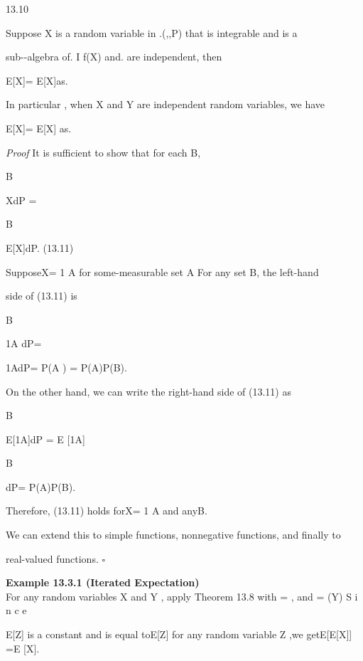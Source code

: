 \begin{thmbox}{13.10}
\end{thmbox}

Suppose X is a random variable in .(\Omega,,P) that is integrable and is a

sub-\sigma-algebra of. I f\sigma(X) and. are independent, then

E[X\vert{}]= E[X]as.

In particular , when X and Y are independent random variables, we have

E[X\vertY]= E[X] as.

\textit{Proof} It is sufficient to show that for each B\in {},

\int

B

XdP =

\int

B

E[X]dP. (13.11)

SupposeX= 1 A for some-measurable set A For any set B\in {}, the left-hand

side of (13.11) is

\int

B

1A dP=

\int

1A\capB dP= P(A \capB) = P(A)P(B).

On the other hand, we can write the right-hand side of (13.11) as

\int

B

E[1A]dP = E [1A]

\int

B

dP= P(A)P(B).

Therefore, (13.11) holds forX= 1 A and anyB\in {}.

We can extend this to simple functions, nonnegative functions, and finally to

real-valued functions. \hfill $\square$

\textbf{Example 13.3.1 (Iterated Expectation)} \\

For any random variables X and Y , apply Theorem 13.8 with ={ \emptyset ,\Omega} and = \sigma(Y) S i n c e

E[Z\vert{}] is a constant and is equal toE[Z] for any random variable Z ,we getE[E[X\vertY]] =E [X].
